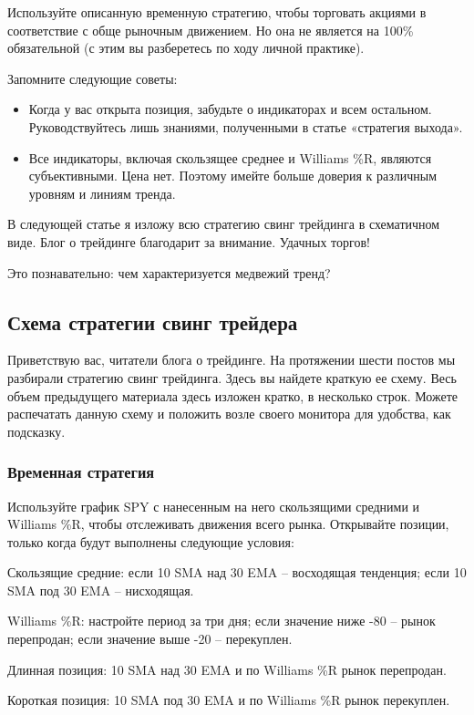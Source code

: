 \documentclass[a5paper]{article}
\begin{document}
Используйте описанную временную стратегию, чтобы торговать акциями в соответствие с обще рыночным движением. Но она не является на 100\% обязательной (с этим вы разберетесь по ходу личной практике).

Запомните следующие советы:
\begin{itemize}
\item     Когда у вас открыта позиция, забудьте о индикаторах и всем остальном. Руководствуйтесь лишь знаниями, полученными в статье «стратегия выхода».
\item     Все индикаторы, включая скользящее среднее и Williams \%R, являются субъективными. Цена нет. Поэтому имейте больше доверия к различным уровням и линиям тренда.
\end{itemize}

В следующей статье я изложу всю стратегию свинг трейдинга в схематичном виде. Блог о трейдинге благодарит за внимание. Удачных торгов!


Это познавательно: чем характеризуется медвежий тренд?

\subsection{Схема стратегии свинг трейдера}

Приветствую вас, читатели блога о трейдинге. На протяжении шести
постов мы разбирали стратегию свинг трейдинга. Здесь вы найдете
краткую ее схему. Весь объем предыдущего материала здесь изложен
кратко, в несколько строк. Можете распечатать данную схему и положить
возле своего монитора для удобства, как подсказку.

\subsubsection{Временная стратегия}

Используйте график SPY с нанесенным на него скользящими средними и Williams \%R, чтобы отслеживать движения всего рынка. Открывайте позиции, только когда будут выполнены следующие условия:

Скользящие средние: если 10 SMA над 30 EMA – восходящая тенденция; если 10 SMA под 30 EMA – нисходящая.

Williams \%R: настройте период за три дня; если значение ниже -80 – рынок перепродан; если значение выше -20 – перекуплен.

Длинная позиция: 10 SMA над 30 EMA и по Williams \%R рынок перепродан.

Короткая позиция: 10 SMA под 30 EMA и по Williams \%R рынок перекуплен.
\end{document}

